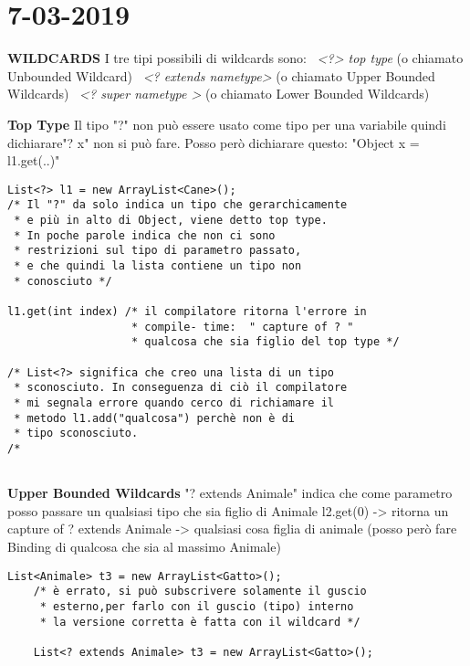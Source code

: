 

\newpage
\section{7-03-2019}
\textbf{WILDCARDS} \newline
I tre tipi possibili di wildcards sono: \newline
\textbullet\ \textit{<?> top type} (o chiamato Unbounded Wildcard) \newline
\textbullet\ \textit{<? extends nametype>} (o chiamato Upper Bounded Wildcards)\newline
\textbullet\ \textit{<? super nametype >} (o chiamato Lower Bounded Wildcards)\newline

\noindent \textbf{Top Type} \newline
Il tipo "?" non può essere usato come tipo per una variabile quindi dichiarare"? x" non si può fare. Posso però dichiarare questo: "Object x = l1.get(..)"
\begin{lstlisting}[basicstyle=\small,]
List<?> l1 = new ArrayList<Cane>();
/* Il "?" da solo indica un tipo che gerarchicamente
 * e più in alto di Object, viene detto top type.
 * In poche parole indica che non ci sono 
 * restrizioni sul tipo di parametro passato,
 * e che quindi la lista contiene un tipo non
 * conosciuto */

l1.get(int index) /* il compilatore ritorna l'errore in
				   * compile- time:  " capture of ? " 
				   * qualcosa che sia figlio del top type */
				   
/* List<?> significa che creo una lista di un tipo
 * sconosciuto. In conseguenza di ciò il compilatore 
 * mi segnala errore quando cerco di richiamare il
 * metodo l1.add("qualcosa") perchè non è di
 * tipo sconosciuto.	
/*
			   
\end{lstlisting}

\noindent \textbf{Upper Bounded Wildcards} \newline
"? extends Animale" indica che come parametro posso passare un qualsiasi tipo che sia figlio di Animale \newline
l2.get(0) -> ritorna un capture of ? extends Animale -> qualsiasi cosa figlia di animale (posso però fare Binding di qualcosa che sia al massimo Animale) \newline

\begin{lstlisting}[basicstyle=\small,]
	List<Animale> t3 = new ArrayList<Gatto>();
	/* è errato, si può subscrivere solamente il guscio
	 * esterno,per farlo con il guscio (tipo) interno
	 * la versione corretta è fatta con il wildcard */
	
	List<? extends Animale> t3 = new ArrayList<Gatto>();
\end{lstlisting}


